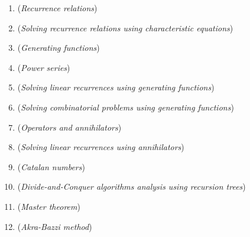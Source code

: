 \documentclass[12pt]{article}
\begin{document}
    \begin{enumerate}
        \item \textbf{} (\textit{Recurrence relations})

        \item \textbf{} (\textit{Solving recurrence relations using characteristic equations})

        \item \textbf{} (\textit{Generating functions})

        \item \textbf{} (\textit{Power series})

        \item \textbf{} (\textit{Solving linear recurrences using generating functions})

        \item \textbf{} (\textit{Solving combinatorial problems using generating functions})

        \item \textbf{} (\textit{Operators and annihilators})

        \item \textbf{} (\textit{Solving linear recurrences using annihilators})

        \item \textbf{} (\textit{Catalan numbers})

        \item \textbf{} (\textit{Divide-and-Conquer algorithms analysis using recursion trees})

        \item \textbf{} (\textit{Master theorem})

        \item \textbf{} (\textit{Akra-Bazzi method})

    \end{enumerate}
\end{document}
